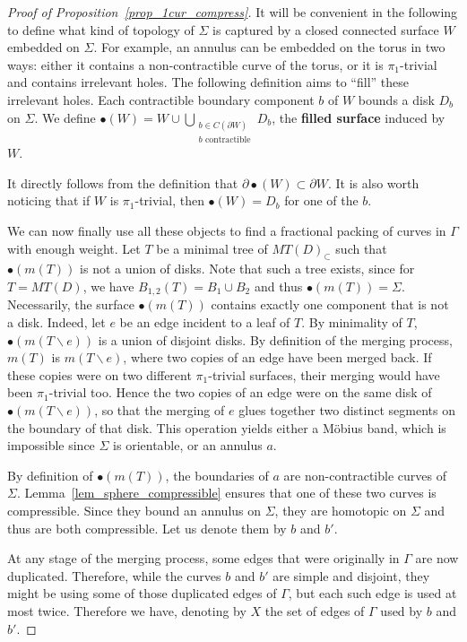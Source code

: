 \documentclass[11pt,a4paper]{article}
\newcommand\oper[4]{#1 \limits_{\substack{#2}}^{#3}{#4}}
\newcommand{\bfdex}[1]{\textbf{#1}\index{#1}}
\newcommand{\obullet}[1]{{\bullet}({#1})}%
\begin{document}
\begin{proof}[Proof of Proposition~\ref{prop_1cur_compress}]
It will be convenient in the following to define what kind of topology of $\Sigma$ is captured by a closed connected surface $W$ embedded on $\Sigma$. For example, an annulus can be embedded on the torus in two ways: either it contains a non-contractible curve of the torus, or it is $\pi_1$-trivial and contains irrelevant holes.
The following definition aims to ``fill'' these irrelevant holes. Each contractible boundary component $b$ of $W$ bounds a disk $D_b$ on $\Sigma$. We define $\obullet{W} = W \cup \oper{\bigcup}{b \in C(\partial W) \\ b \text{ contractible}}{}{D_b}$, the \bfdex{filled surface} induced by $W$. 

It directly follows from the definition that $\partial \obullet{W} \subset \partial W$. It is also worth noticing that if $W$ is $\pi_1$-trivial, then $\obullet{W} = D_b$ for one of the $b$.

 We can now finally use all these objects to find a fractional packing of curves in $\Gamma$ with enough weight. Let $T$ be a minimal tree of $MT(D)_{\subset}$ such that $\obullet{m(T)}$ is not a union of disks. Note that such a tree exists, since for $T=MT(D)$, we have $B_{1,2}(T)=B_1\cup B_2$ and thus $\obullet{m(T)}=\Sigma$. Necessarily, the surface $\obullet{m(T)}$ contains exactly one component that is not a disk. Indeed, let $e$ be an edge incident to a leaf of $T$. By minimality of $T$, $\obullet{m(T \smallsetminus e)}$ is a union of disjoint disks. By definition of the merging process, $m(T)$ is $m(T \smallsetminus e)$, where two copies of an edge have been merged back. If these copies were on two different $\pi_1$-trivial surfaces, their merging would have been $\pi_1$-trivial too. Hence the two copies of an edge were on the same disk of $\obullet{m(T \smallsetminus e)}$, so that the merging of $e$ glues together two distinct segments on the boundary of that disk. This operation yields either a Möbius band, which is impossible since $\Sigma$ is orientable, or an annulus $a$.

By definition of $\obullet{m(T)}$, the boundaries of $a$ are non-contractible curves of $\Sigma$. 
Lemma~\ref{lem_sphere_compressible} ensures that one of these two curves is compressible. Since they bound an annulus on $\Sigma$, they are homotopic on $\Sigma$ and thus are both compressible. Let us denote them by $b$ and $b'$.

At any stage of the merging process, some edges that were originally in $\Gamma$ are now duplicated. Therefore, while the curves $b$ and $b'$ are simple and disjoint, they might be using some of those duplicated edges of $\Gamma$, but each such edge is used at most twice. Therefore we have, denoting by $X$ the set of edges of $\Gamma$ used by $b$ and $b'$.


\end{proof}
\end{document}
